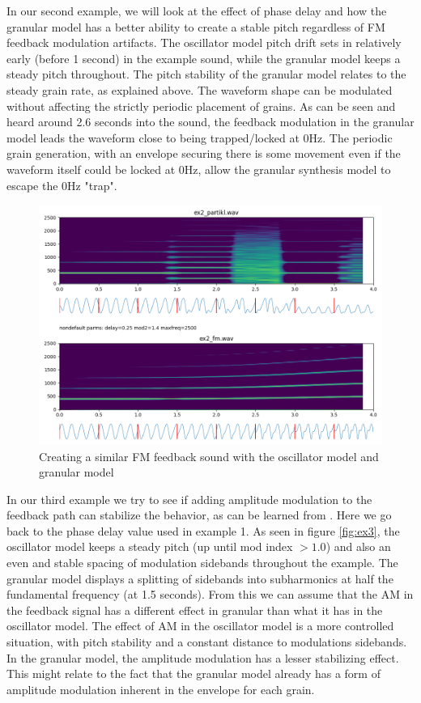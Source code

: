 \documentclass[runningheads,a4paper]{llncs}
\begin{document}
In our second example, we will look at the effect of phase delay and how the granular model has a better ability to create a stable pitch regardless of FM feedback modulation artifacts. The oscillator model pitch drift sets in relatively early (before 1 second) in the example sound, while the granular model keeps a steady pitch throughout. The pitch stability of the granular model relates to the steady grain rate, as explained above. The waveform shape can be modulated without affecting the strictly periodic placement of grains. As can be seen and heard around 2.6 seconds into the sound, the feedback modulation in the granular model leads the waveform close to being trapped/locked at 0Hz. The periodic grain generation, with an envelope securing there is some movement even if the waveform itself could be locked at 0Hz, allow the granular synthesis model to escape the 0Hz "trap".

\begin{figure}
	\centering
	\includegraphics[width=.95\textwidth]{ex2_compare.png}
	\caption{Creating a similar FM feedback sound with the oscillator model and granular model}
	\label{fig:ex2}
\end{figure}

In our third example we  try to see if adding amplitude modulation to the feedback path can stabilize the behavior, as can be learned from \cite{Lazzarini-2024}. Here we go back to the phase delay value used in example 1. As seen in figure \ref{fig:ex3}, the oscillator model keeps a steady pitch (up until mod index $> 1.0$) and also an even and stable spacing of modulation sidebands throughout the example. The granular model displays a splitting of sidebands into subharmonics at half the fundamental frequency (at 1.5 seconds). From this we can assume that the AM in the feedback signal has a different effect in granular than what it has in the oscillator model. The effect of AM in the oscillator model is a more controlled situation, with pitch stability and a constant distance to modulations sidebands. In the granular model, the amplitude modulation has a lesser stabilizing effect. This might relate to the fact that the granular model already has a form of amplitude modulation inherent in the envelope for each grain.
\end{document}
